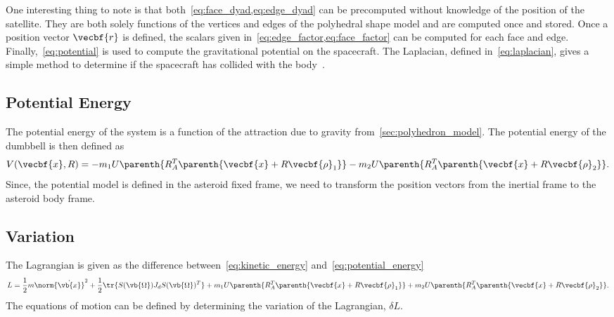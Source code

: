 \documentclass[11pt, reqno]{article}    %
\begin{document}
One interesting thing to note is that both~\cref{eq:face_dyad,eq:edge_dyad} can be precomputed without knowledge of the position of the satellite.
They are both solely functions of the vertices and edges of the polyhedral shape model and are computed once and stored.
Once a position vector \( \vecbf{r} \) is defined, the scalars given in~\cref{eq:edge_factor,eq:face_factor} can be computed for each face and edge.
Finally,~\cref{eq:potential} is used to compute the gravitational potential on the spacecraft.
The Laplacian, defined in~\cref{eq:laplacian}, gives a simple method to determine if the spacecraft has collided with the body~\cite{werner1996}. 

\subsection{Potential Energy}
The potential energy of the system is a function of the attraction due to gravity from~\cref{sec:polyhedron_model}.
The potential energy of the dumbbell is then defined as
\begin{align}\label{eq:potential_energy}
    V( \vecbf{x}, R ) =  - m_1 U \parenth{R_A^T \parenth{\vecbf{x} + R \vecbf{\rho}_1}} - m_2 U \parenth{R_A^T \parenth{\vecbf{x} + R \vecbf{\rho}_2}} .
\end{align}
Since, the potential model is defined in the asteroid fixed frame, we need to transform the position vectors from the inertial frame to the asteroid body frame.

\subsection{Variation}
The Lagrangian is given as the difference between~\cref{eq:kinetic_energy} and~\cref{eq:potential_energy}
\begin{align}\label{eq:lagrangian}
    L = \frac{1}{2} m \norm{\dot{\vb{x}}}^2 + \frac{1}{2} \tr{S(\vb{\Omega}) J_d S(\vb{\Omega})^T} + m_1 U \parenth{R_A^T \parenth{\vecbf{x} + R \vecbf{\rho}_1}} + m_2 U \parenth{R_A^T \parenth{\vecbf{x} + R \vecbf{\rho}_2}} .
\end{align}
The equations of motion can be defined by determining the variation of the Lagrangian, \( \delta L\).
\end{document}
